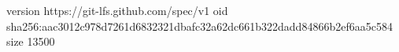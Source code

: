 version https://git-lfs.github.com/spec/v1
oid sha256:aac3012c978d7261d6832321dbafc32a62dc661b322dadd84866b2ef6aa5c584
size 13500
